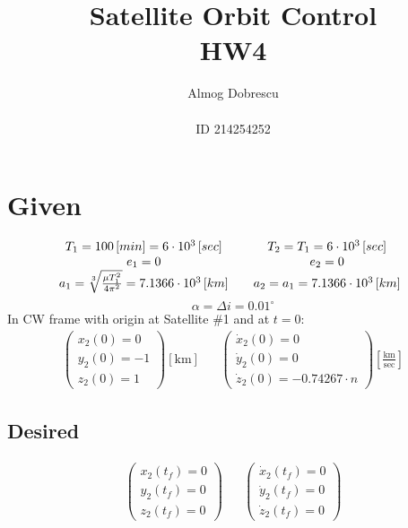 \documentclass[11pt, a4paper]{article}
\title{Satellite Orbit Control \\ HW4}
\author{Almog Dobrescu\\\\ID 214254252}
\begin{document}
\maketitle

\thispagestyle{empty}
\newpage
\setcounter{page}{1}

\tableofcontents
\vfil
\listoffigures
\newpage

\section{Given}
\begin{equation*}
    \begin{matrix}
        T_1=100\left[min\right] = 6\cdot10^3\left[sec\right] && T_2 = T_1 = 6\cdot10^3\left[sec\right] \\
        e_1 = 0 && e_2 = 0 \\
        a_1 = \sqrt[3]{\frac{\mu T_1^2}{4\pi^2}} = 7.1366\cdot10^3\left[km\right] && a_2 = a_1 = 7.1366\cdot10^3\left[km\right]
    \end{matrix}\\
\end{equation*}
\begin{equation*}
    \alpha=\Delta i = 0.01^\circ
\end{equation*}
In CW frame with origin at Satellite \#1 and at $t=0$:
\begin{equation*}
    \begin{matrix}
    \begin{pmatrix}
        x_2(0)=0 \\ y_2(0)=-1 \\ z_2(0)=1
    \end{pmatrix}\left[\mathrm{km}\right] &&
    \begin{pmatrix}
        \dot{x}_2(0)=0 \\ \dot{y}_2(0) =0 \\ \dot{z}_2(0)=-0.74267\cdot n
    \end{pmatrix}\displaystyle\left[\frac{\mathrm{km}}{\mathrm{sec}}\right]
    \end{matrix}
\end{equation*}

\subsection{Desired}
\begin{equation*}
    \begin{matrix}
    \begin{pmatrix}
        x_2(t_f)=0 \\ y_2(t_f)=0 \\ z_2(t_f)=0
    \end{pmatrix} &&
    \begin{pmatrix}
        \dot{x}_2(t_f)=0 \\ \dot{y}_2(t_f)=0 \\ \dot{z}_2(t_f)=0
    \end{pmatrix}
    \end{matrix}
\end{equation*}
\end{document}
